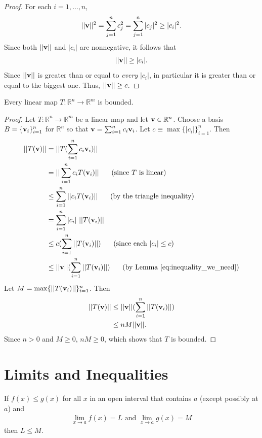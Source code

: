 \documentclass[12pt,letterpaper,reqno]{article}
\numberwithin{equation}{section}
\newcommand{\R}{\ensuremath{\mathbb R}}
\newcommand{\bv}{{\bf v}}
\begin{document}
{\begin{proof}
For each $i=1,\dots,n$,
	\begin{align*}
		||\bv||^2=\sum_{j=1}^n c_j^2=\sum_{j=1}^n |c_j|^2 \geq |c_i|^2. 
	\end{align*}
Since both $||\bv||$ and $|c_i|$ are nonnegative, it follows that
\begin{align*}
	||\bv|| \geq |c_i|.
\end{align*}
Since $||\bv||$ is greater than or equal to \emph{every} $|c_i|$, in particular it is greater than or equal to the biggest one. Thus, $||\bv||\geq c$.
\end{proof}

\begin{thm}\label{thm:every_lin_map_is_bdd}
	Every linear map $T:\R^n \to \R^m$ is bounded.
\end{thm}

\begin{proof}
	Let $T:\R^n \to \R^m$ be a linear map and let $\bv \in \R^n$. Choose a basis $B=\{\bv_i\}_{i=1}^n$ for $\R^n$ so that $\bv=\sum_{i=1}^nc_i\bv_i$. Let $c \equiv \max\{|c_i|\}_{i=1}^n$. Then
	\begin{align*}
		||T(\bv)||&=||T(\sum_{i=1}^nc_i\bv_i)|| \\
		&=||\sum_{i=1}^nc_i T(\bv_i)|| \hspace{0.5cm} \text{ (since $T$ is linear)}\\
		&\leq \sum_{i=1}^n ||c_i T(\bv_i)|| \hspace{0.5cm} \text{ (by the triangle inequality)}\\
		&=\sum_{i=1}^n|c_i| \ ||T(\bv_i)|| \\
		&\leq c(\sum_{i=1}^n ||T(\bv_i)||) \hspace{0.5cm} \text{ (since each $|c_i|\leq c$)}\\
		& \leq ||\bv||(\sum_{i=1}^n ||T(\bv_i)||) \hspace{0.5cm} \text{ (by Lemma \ref{eq:inequality_we_need})}\\
	\end{align*}
Let $M=\max\{||T(\bv_i)||\}_{i=1}^n$. Then
\begin{align*}
	||T(\bv)||&\leq ||\bv||(\sum_{i=1}^n ||T(\bv_i)||) \\
	&\leq nM||\bv||. 
\end{align*}	
Since $n>0$ and $M \geq 0$, $nM \geq 0$, which shows that $T$ is bounded.
\end{proof}

\section{Limits and Inequalities}\label{app:lim_and_ineq}
\begin{thm}
If $f(x) \leq g(x)$ for all $x$ in an open interval that contains $a$ (except possibly at $a$) and 
\begin{align*}
	\lim_{x \to a}f(x)=L \text{ and } \lim_{x \to a}g(x)=M
\end{align*}	
then $L \leq M$.
\end{thm}

}
\end{document}
